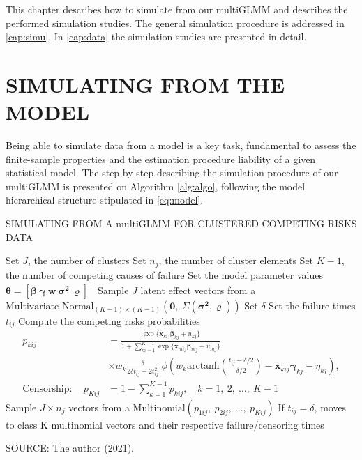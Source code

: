 This chapter describes how to simulate from our multiGLMM and describes
the performed simulation studies. The general simulation procedure is
addressed in \autoref{cap:simu}. In \autoref{cap:data} the simulation
studies are presented in detail.

\section{SIMULATING FROM THE MODEL}
\label{cap:simu}

Being able to simulate data from a model is a key task, fundamental to
assess the finite-sample properties and the estimation procedure
liability of a given statistical model. The step-by-step describing the
simulation procedure of our multiGLMM is presented on Algorithm
\autoref{alg:algo}, following the model hierarchical structure
stipulated in \autoref{eq:model}.

\begin{algorithm}[H]
 \caption{SIMULATING FROM A \(\text{multiGLMM}\) FOR CLUSTERED COMPETING
          RISKS DATA}
 \label{alg:algo}
 \begin{algorithmic}[1]
  \State
   Set \(J\), the number of clusters
  \State
   Set \(n_{j}\), the number of cluster elements
  \State
   Set \(K-1\), the number of competing causes of failure
  \State
   Set the model parameter values \(\bm{\theta} =
   [\bm{\beta}~\bm{\gamma}~\bm{w}~\bm{\sigma^{2}}~\bm{\varrho}]^{\top}\)
  \State
   Sample \(J\) latent effect vectors from a
   \(\text{Multivariate Normal}_{(K-1)\times(K-1)}(
      \bm{0},~\Sigma(\bm{\sigma^{2},\varrho})
     )\)
  \State
   Set \(\delta\)
  \State
   Set the failure times \(t_{ij}\)
  \State
   Compute the competing risks probabilities
   \begin{align*}
    p_{kij} &=
    \frac{\exp\{\bm{x}_{kij}\bm{\beta}_{kj} + u_{kj}\}}{
          1 +
          \sum_{m=1}^{K-1}\exp\{\bm{x}_{mij}\bm{\beta}_{mj} + u_{mj}\}
         }\\
    &\times w_{k}\frac{\delta}{2\delta t_{ij} - 2t_{ij}^{2}}~
     \phi\left(w_{k}
      \text{arctanh}\left(\frac{t_{ij}-\delta/2}{\delta/2}\right) -
      \bm{x}_{kij}\bm{\gamma}_{kj} - \eta_{kj}
     \right),\\
    \text{Censorship}: \quad
    p_{Kij} &=
    1 - \sum_{k=1}^{K-1} p_{kij}, \quad k = 1,~2,~\dots,~K-1
   \end{align*}
  \State
   Sample \(J\times n_{j}\) vectors from a
   \(\text{Multinomial}(p_{1ij},~p_{2ij},~\dots,~p_{Kij})\)
  \State
   If \(t_{ij} = \delta\), moves to class K
  \State
   \Return
    multinomial vectors and their respective failure/censoring times
 \end{algorithmic}
\end{algorithm}
\vspace{-1cm}
\begin{footnotesize}
  \begin{center}
    SOURCE: The author (2021).
  \end{center}
\end{footnotesize}

